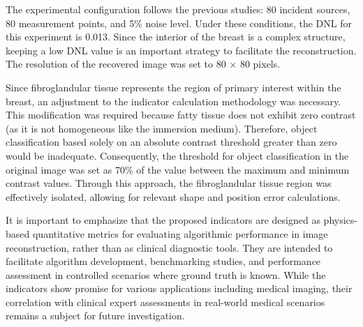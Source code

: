 \documentclass{ieeeaccess}
\begin{document}
        The experimental configuration follows the previous studies: 80 incident sources, 80 measurement points, and 5\% noise level. Under these conditions, the DNL for this experiment is 0.013. Since the interior of the breast is a complex structure, keeping a low DNL value is an important strategy to facilitate the reconstruction. The resolution of the recovered image was set to 80 $\times$ 80 pixels.

        Since fibroglandular tissue represents the region of primary interest within the breast, an adjustment to the indicator calculation methodology was necessary. This modification was required because fatty tissue does not exhibit zero contrast (as it is not homogeneous like the immersion medium). Therefore, object classification based solely on an absolute contrast threshold greater than zero would be inadequate. Consequently, the threshold for object classification in the original image was set as 70\% of the value between the maximum and minimum contrast values. Through this approach, the fibroglandular tissue region was effectively isolated, allowing for relevant shape and position error calculations.

        It is important to emphasize that the proposed indicators are designed as physics-based quantitative metrics for evaluating algorithmic performance in image reconstruction, rather than as clinical diagnostic tools. They are intended to facilitate algorithm development, benchmarking studies, and performance assessment in controlled scenarios where ground truth is known. While the indicators show promise for various applications including medical imaging, their correlation with clinical expert assessments in real-world medical scenarios remains a subject for future investigation.
\end{document}

